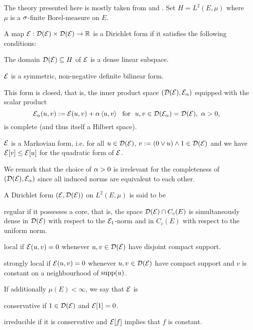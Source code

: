 The theory presented here is mostly taken from \cite{fukushima2011dirichlet} and \cite[ch. 4]{ma2012introduction}. Set $H=L^2(E,\mu)$ where $\mu$ is a $\sigma$-finite Borel-measure on $E$. 
\begin{defin}
  A map $\mathcal{E}:\mathcal{D}(\mathcal{E})\times\mathcal{D}(\mathcal{E})\to\mathbb{R}$ is a Dirichlet form if it satisfies the following conditions:
  \begin{compactenum}[i.]
  \item The domain $\mathcal{D}(\mathcal{E})\subseteq H$ of $\mathcal{E}$ is a dense linear subspace.
  \item $\mathcal{E}$ is a symmetric, non-negative definite bilinear form.
  \item This form is closed, that is, the inner product space $(\mathcal{D}(\mathcal{E}),\mathcal{E}_\alpha)$ equipped with the scalar product
  \[
    \cE_\ga(u,v):=\cE(u,v)+\ga\left<u,v\right>\ \text{ for }\ u,v\in\cD(\cE_\ga)=\cD(\cE),\ \ga>0,
  \]
  is complete (and thus itself a Hilbert space).
  \item $\mathcal{E}$ is a Markovian form, i.e. for all $u\in\mathcal{D}(\mathcal{E})$, $v:=(0\vee u)\wedge 1\in\mathcal{D}(\mathcal{E})$ and we have $\mathcal{E}[v]\leq\mathcal{E}[u]$ for the quadratic form of $\mathcal{E}$. 
  \end{compactenum}
\end{defin}
We remark that the choice of $\alpha>0$ is irrelevant for the completeness of $(\mathcal{D}(\mathcal{E}),\mathcal{E}_\alpha)$ since all induced norms are equivalent to each other. 
\begin{defin}
  A Dirichlet form $(\mathcal{E},\mathcal{D}(\mathcal{E}))$ on $L^2(E,\mu)$ is said to be
  \begin{compactenum}[i.]
    \item regular if it possesses a core, that is, the space $\mathcal{D}(\mathcal{E})\cap C_c(E)$ is simultaneously dense in $\mathcal{D}(\mathcal{E})$ with respect to the $\mathcal{E}_1$-norm and in $C_c(E)$ with respect to the uniform norm. 
    \item local if $\mathcal{E}(u,v)=0$ whenever $u,v\in\mathcal{D}(\mathcal{E})$ have disjoint compact support.
    \item strongly local if $\mathcal{E}(u,v)=0$ whenever $u,v\in\mathcal{D}(\mathcal{E})$ have compact support and $v$ is constant on a neighbourhood of $\operatorname{supp}(u)$.
  \end{compactenum}
  If additionally $\mu(E)<\infty$, we say that $\mathcal{E}$ is
  \begin{compactenum}[i.]
    \setcounter{enumi}{3}
    \item conservative if $1\in\mathcal{D}(\mathcal{E})$ and $\mathcal{E}[1]=0$.
    \item irreducible if it is conservative and $\mathcal{E}[f]$ implies that $f$ is constant. 
  \end{compactenum}
\end{defin}
